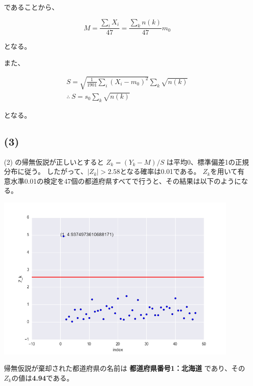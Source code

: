 \documentclass[a4j,xelatex,ja=standard,jafont=hiragino-pron, 10pt]{bxjsarticle}
\let\origfigure=\figure
\let\endorigfigure=\endfigure
\renewenvironment{figure}[1][]{%
  \origfigure[H]
}{%
  \endorigfigure
}
\begin{document}
であることから、

\begin{equation}
M = \frac{\sum_i X_i}{47} = \frac{\sum_k n(k)}{47} m_0
\end{equation}

となる。

また、

\begin{eqnarray}
S = \sqrt{\frac{1}{1901} \sum_i (X_i - m_0)^2} \sum_k \sqrt{n(k)} \nonumber \\
\therefore \ S = s_0 \sum_k \sqrt{n(k)}
\end{eqnarray}

となる。

\subsection*{(3)}

(2) の帰無仮説が正しいとすると $Z_k = (Y_k - M) / S$ は平均0、標準偏差1の正規分布に従う。
したがって、$|Z_k| > 2.58$となる確率は0.01である。
$Z_k$を用いて有意水準0.01の検定を47個の都道府県すべてで行うと、その結果は以下のようになる。

\begin{figure}
  \centering
  \includegraphics[width=12cm]{../src/output/image/examine.png}
  \caption{検定の結果}
  \label{}
\end{figure}

帰無仮説が棄却された都道府県の名前は
\textbf{都道府県番号1：北海道}
であり、その$Z_k$の値は\textbf{4.94}である。
\end{document}
